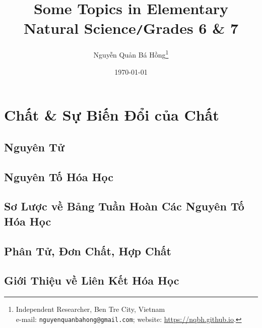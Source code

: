 \documentclass{article}
\title{Some Topics in Elementary Natural Science\texttt{/}Grades 6 \& 7}
\author{Nguyễn Quản Bá Hồng\footnote{Independent Researcher, Ben Tre City, Vietnam\\e-mail: \texttt{nguyenquanbahong@gmail.com}; website: \url{https://nqbh.github.io}.}}
\date{\today}
\numberwithin{equation}{section}
\begin{document}
\maketitle
\begin{abstract}
	
\end{abstract}
\setcounter{secnumdepth}{4}
\setcounter{tocdepth}{3}
\tableofcontents
\newpage


\section{Chất \& Sự Biến Đổi của Chất}

\subsection{Nguyên Tử}


\subsection{Nguyên Tố Hóa Học}


\subsection{Sơ Lược về Bảng Tuần Hoàn Các Nguyên Tố Hóa Học}


\subsection{Phân Tử, Đơn Chất, Hợp Chất}


\subsection{Giới Thiệu về Liên Kết Hóa Học}

\end{document}
